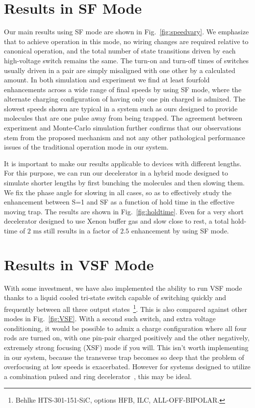 \documentclass[%
 reprint,
 amsmath,amssymb,
 aps,
prl,
]{revtex4-1}
\begin{document}
\section{Results in SF Mode}
Our main results using SF mode are shown in Fig.~\ref{fig:speedvary}.
We emphasize that to achieve operation in this mode, no wiring changes are required relative to canonical operation, and the total number of state transitions driven by each high-voltage switch remains the same. 
The turn-on and turn-off times of switches usually driven in a pair are simply misaligned with one other by a calculated amount.
In both simulation and experiment we find at least fourfold enhancements across a wide range of final speeds by using SF mode, where the alternate charging configuration of having only one pin charged is admixed. 
The slowest speeds shown are typical in a system such as ours designed to provide molecules that are one pulse away from being trapped. 
The agreement between experiment and Monte-Carlo simulation further confirms that our observations stem from the proposed mechanism and not any other pathological performance issues of the traditional operation mode in our system.

It is important to make our results applicable to devices with different lengths. 
For this purpose, we can run our decelerator in a hybrid mode designed to simulate shorter lengths by first bunching the molecules and then slowing them. 
We fix the phase angle for slowing in all cases, so as to effectively study the enhancement between S=1 and SF as a function of hold time in the effective moving trap. 
The results are shown in Fig.~\ref{fig:holdtime}. 
Even for a very short decelerator designed to use Xenon buffer gas and slow close to rest, a total hold-time of $2\text{ ms}$ still results in a factor of $2.5$ enhancement by using SF mode.

\section{Results in VSF Mode}
With some investment, we have also implemented the ability to run VSF mode thanks to a liquid cooled tri-state switch capable of switching quickly and frequently between all three output states~\footnote{Behlke HTS-301-151-SiC, options HFB, ILC, ALL-OFF-BIPOLAR.}. This is also compared against other modes in Fig.~\ref{fig:VSF}. With a second such switch, and extra voltage conditioning, it would be possible to admix a charge configuration where all four rods are turned on, with one pin-pair charged positively and the other negatively, extremely strong focusing (XSF) mode if you will. This isn't worth implementing in our system, because the transverse trap becomes so deep that the problem of overfocusing at low speeds is exacerbated. However for systems designed to utilize a combination pulsed and ring decelerator~\cite{Quintero-Perez2013}, this may be ideal.
\end{document}
